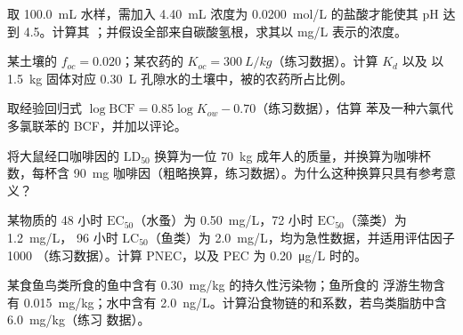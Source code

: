 \begin{exercise}[$\star\star$]\label{exo:b3:environmental-toxicology:6}
取 \qty{100.0}{mL} 水样，需加入 \qty{4.40}{mL} 浓度为 \qty{0.0200}{mol/L} 的盐酸才能使其 pH 达到 4.5。计算其
；并假设全部来自碳酸氢根，求其以 mg/L 表示的浓度。
\end{exercise}

\begin{exercise}[$\star\star$]\label{exo:b3:environmental-toxicology:7}
某土壤的 $f_{oc} = 0.020$；某农药的 $K_{oc} = \qty{300}{L/kg}$（练习数据）。计算 $K_d$ 以及
以 \qty{1.5}{kg} 固体对应 \qty{0.30}{L} 孔隙水的土壤中，被的农药所占比例。
\end{exercise}

\begin{exercise}[$\star\star$]\label{exo:b3:environmental-toxicology:8}
取经验回归式 $\log\mathrm{BCF} = 0.85\log K_{ow} - 0.70$（练习数据），估算
苯及一种六氯代多氯联苯的 BCF，并加以评论。
\end{exercise}

\begin{exercise}[$\star\star$]\label{exo:b3:environmental-toxicology:9}
将大鼠经口咖啡因的 $\mathrm{LD_{50}}$ 换算为一位 \qty{70}{kg} 成年人的质量，并换算为咖啡杯数，每杯含
\qty{90}{mg} 咖啡因（粗略换算，练习数据）。为什么这种换算只具有参考意义？
\end{exercise}

\begin{exercise}[$\star\star\star$]\label{exo:b3:environmental-toxicology:10}
某物质的 48 小时 $\mathrm{EC_{50}}$（水蚤）为 \qty{0.50}{mg/L}，72 小时 $\mathrm{EC_{50}}$（藻类）为 \qty{1.2}{mg/L}，
96 小时 $\mathrm{LC_{50}}$（鱼类）为 \qty{2.0}{mg/L}，均为急性数据，并适用评估因子 1000
（练习数据）。计算 PNEC，以及 PEC 为 \qty{0.20}{\micro g/L} 时的。
\end{exercise}

\begin{exercise}[$\star\star\star$]\label{exo:b3:environmental-toxicology:11}
某食鱼鸟类所食的鱼中含有 \qty{0.30}{mg/kg} 的持久性污染物；鱼所食的
浮游生物含有 \qty{0.015}{mg/kg}；水中含有 \qty{2.0}{ng/L}。计算沿食物链的和系数，若鸟类脂肪中含 \qty{6.0}{mg/kg}（练习
数据）。
\end{exercise}


